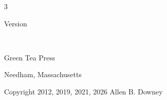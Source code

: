 
%
%
%
%
%
%




\pagebreak


\thispagestyle{empty}

\begin{flushright}
\vspace*{2.0in}

\begin{spacing}{3}
{\huge \thetitle}
\end{spacing}

\vspace{0.25in}

Version \theversion

\vspace{1in}


{\Large
\theauthors \\
}


\vspace{0.5in}

{\Large Green Tea Press}

{\small Needham, Massachusetts}

\vfill

\end{flushright}

\pagebreak



\thispagestyle{empty}

\vspace{2in}

\begin{center}
 {\Large \thetitle}

\vspace{0.25in}

Copyright 2012, 2019, 2021, 2026 Allen B. Downey
\end{center}



